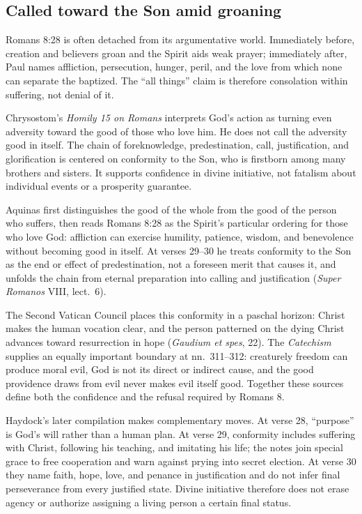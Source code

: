 \begin{deepstudy}
\sectionguard
\subsection*{Called toward the Son amid groaning\enspace{}}

Romans 8:28 is often detached from its argumentative world. Immediately before, creation and believers groan and the Spirit aids weak prayer; immediately after, Paul names affliction, persecution, hunger, peril, and the love from which none can separate the baptized. The ``all things'' claim is therefore consolation within suffering, not denial of it.

Chrysostom's \emph{Homily 15 on Romans} interprets God's action as turning even adversity toward the good of those who love him. He does not call the adversity good in itself. The chain of foreknowledge, predestination, call, justification, and glorification is centered on conformity to the Son, who is firstborn among many brothers and sisters. It supports confidence in divine initiative, not fatalism about individual events or a prosperity guarantee.

Aquinas first distinguishes the good of the whole from the good of the person who suffers, then reads Romans 8:28 as the Spirit's particular ordering for those who love God: affliction can exercise humility, patience, wisdom, and benevolence without becoming good in itself. At verses 29--30 he treats conformity to the Son as the end or effect of predestination, not a foreseen merit that causes it, and unfolds the chain from eternal preparation into calling and justification (\emph{Super Romanos} VIII, lect.~6).

The Second Vatican Council places this conformity in a paschal horizon: Christ makes the human vocation clear, and the person patterned on the dying Christ advances toward resurrection in hope (\emph{Gaudium et spes}, 22). The \emph{Catechism} supplies an equally important boundary at nn.~311--312: creaturely freedom can produce moral evil, God is not its direct or indirect cause, and the good providence draws from evil never makes evil itself good. Together these sources define both the confidence and the refusal required by Romans 8.

Haydock's later compilation makes complementary moves. At verse 28, ``purpose'' is God's will rather than a human plan. At verse 29, conformity includes suffering with Christ, following his teaching, and imitating his life; the notes join special grace to free cooperation and warn against prying into secret election. At verse 30 they name faith, hope, love, and penance in justification and do not infer final perseverance from every justified state. Divine initiative therefore does not erase agency or authorize assigning a living person a certain final status.


\end{deepstudy}
